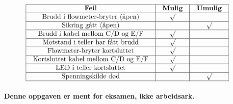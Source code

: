 $$\vbox{\offinterlineskip
\halign{\strut
\vrule \quad\hfil # \ \hfil &
\vrule \quad\hfil # \ \hfil &
\vrule \quad\hfil # \ \hfil \vrule \cr
\noalign{\hrule}
%
{\bf Feil} & {\bf Mulig} & {\bf Umulig} \cr
%
\noalign{\hrule}
%
Brudd i flowmeter-bryter (åpen) & $\surd$ &  \cr
%
\noalign{\hrule}
%
Sikring gått (åpen) &  & $\surd$ \cr
%
\noalign{\hrule}
%
Brudd i kabel mellom C/D og E/F & $\surd$ &  \cr
%
\noalign{\hrule}
%
Motstand i teller har fått brudd & $\surd$ &  \cr
%
\noalign{\hrule}
%
Flowmeter-bryter kortsluttet & $\surd$ &  \cr
%
\noalign{\hrule}
%
Kortsluttet kabel mellom C/D og E/F & $\surd$ &  \cr
%
\noalign{\hrule}
%
LED i teller kortsluttet & $\surd$ &  \cr
%
\noalign{\hrule}
%
Spenningskilde død &  & $\surd$ \cr
%
\noalign{\hrule}
} %
}$$ %








{\bf Denne oppgaven er ment for eksamen, ikke arbeidsark.}

